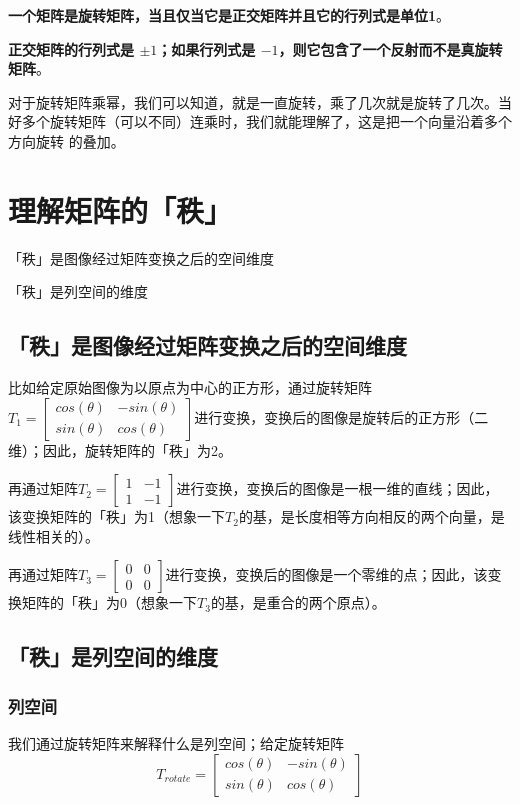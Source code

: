 \documentclass[12pt]{article}
\begin{document}
\textbf{一个矩阵是旋转矩阵，当且仅当它是正交矩阵并且它的行列式是单位1}。

\textbf{正交矩阵的行列式是 $\pm 1$；如果行列式是 $−1$，则它包含了一个反射而不是真旋转矩阵}。

对于旋转矩阵乘幂，我们可以知道，就是一直旋转，乘了几次就是旋转了几次。当好多个旋转矩阵（可以不同）连乘时，我们就能理解了，这是把一个向量沿着多个方向旋转 的叠加。

\section{理解矩阵的「秩」\cite{How_To_Understand_Rank_Of_Matrix}}
「秩」是图像经过矩阵变换之后的空间维度

「秩」是列空间的维度

\subsection{「秩」是图像经过矩阵变换之后的空间维度}
比如给定原始图像为以原点为中心的正方形，通过旋转矩阵$T_1=\begin{bmatrix}cos(\theta)&-sin(\theta)\\sin(\theta)&cos(\theta)\end{bmatrix}$进行变换，变换后的图像是旋转后的正方形（二维）；因此，旋转矩阵的「秩」为2。

再通过矩阵$T_2=\begin{bmatrix}1&-1\\1&-1\end{bmatrix}$进行变换，变换后的图像是一根一维的直线；因此，该变换矩阵的「秩」为1（想象一下$T_2$的基，是长度相等方向相反的两个向量，是线性相关的）。

再通过矩阵$T_3=\begin{bmatrix}0&0\\0&0\end{bmatrix}$进行变换，变换后的图像是一个零维的点；因此，该变换矩阵的「秩」为0（想象一下$T_3$的基，是重合的两个原点）。

\subsection{「秩」是列空间的维度}
\subsubsection{列空间}
我们通过旋转矩阵来解释什么是列空间；给定旋转矩阵
$$
T_{rotate}=
\begin{bmatrix}
    cos(\theta) & -sin(\theta)\\
    sin(\theta) & cos(\theta)
\end{bmatrix}
$$
\end{document}
